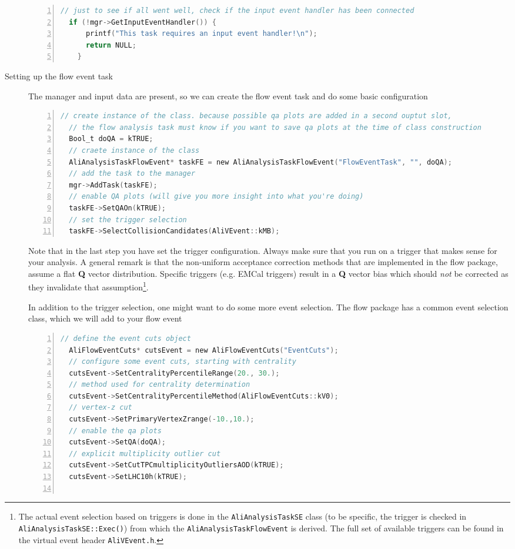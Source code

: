 \documentclass[a4paper]{book}
\numberwithin{equation}{subsection}
\begin{document}
\begin{description}
\begin{lstlisting}[language=C, numbers=left]
  // just to see if all went well, check if the input event handler has been connected
  if (!mgr->GetInputEventHandler()) {
      printf("This task requires an input event handler!\n");
      return NULL;
    }\end{lstlisting}
    \item [Setting up the flow event task]
The manager and input data are present, so we can create the flow event task and do some basic configuration
\begin{lstlisting}[language=C, numbers=left]
  // create instance of the class. because possible qa plots are added in a second ouptut slot,
  // the flow analysis task must know if you want to save qa plots at the time of class construction
  Bool_t doQA = kTRUE;
  // craete instance of the class
  AliAnalysisTaskFlowEvent* taskFE = new AliAnalysisTaskFlowEvent("FlowEventTask", "", doQA);
  // add the task to the manager
  mgr->AddTask(taskFE);
  // enable QA plots (will give you more insight into what you're doing)
  taskFE->SetQAOn(kTRUE);
  // set the trigger selection
  taskFE->SelectCollisionCandidates(AliVEvent::kMB);\end{lstlisting}
Note that in the last step you have set the trigger configuration. Always make sure that you run on a trigger that makes sense for your analysis. A general remark is that the non-uniform acceptance correction methods that are implemented in the flow package, assume a flat \textbf{Q} vector distribution. Specific triggers (e.g. EMCal triggers) result in a \textbf{Q} vector bias which should \emph{not} be corrected as they invalidate that assumption\footnote{The actual event selection based on triggers is done in the \texttt{AliAnalysisTaskSE} class (to be specific, the trigger is checked in \texttt{AliAnalysisTaskSE::Exec()}) from which the \texttt{AliAnalysisTaskFlowEvent} is derived. The full set of available triggers can be found in the virtual event header \texttt{AliVEvent.h}. }.

In addition to the trigger selection, one might want to do some more event selection. The flow package has a common event selection class, which we will add to your flow event

\begin{lstlisting}[language=C, numbers=left]
  // define the event cuts object
  AliFlowEventCuts* cutsEvent = new AliFlowEventCuts("EventCuts");
  // configure some event cuts, starting with centrality
  cutsEvent->SetCentralityPercentileRange(20., 30.);
  // method used for centrality determination
  cutsEvent->SetCentralityPercentileMethod(AliFlowEventCuts::kV0);
  // vertex-z cut
  cutsEvent->SetPrimaryVertexZrange(-10.,10.);
  // enable the qa plots
  cutsEvent->SetQA(doQA);
  // explicit multiplicity outlier cut
  cutsEvent->SetCutTPCmultiplicityOutliersAOD(kTRUE);
  cutsEvent->SetLHC10h(kTRUE);
  

\end{lstlisting}
\end{description}
\end{document}
